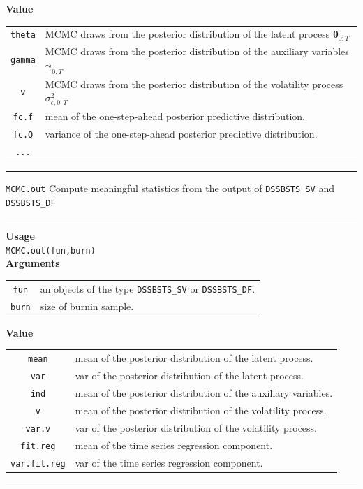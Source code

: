 \documentclass[
  12pt,
]{book}
\theoremstyle{break}
\theoremstyle{nonumberplain}
\begin{document}
\textbf{Value}

\begin{small}
\begin{longtable}{ c l }
\texttt{theta} & MCMC draws from the posterior distribution of the latent process $\boldsymbol{\theta}_{0:T}$  \\
\texttt{gamma} &  MCMC draws from the posterior distribution of the auxiliary variables $\boldsymbol{\gamma}_{0:T}$\\
\texttt{v} &  MCMC draws from the posterior distribution of the volatility process $\sigma^{2}_{\epsilon,0:T}$ \\
\texttt{fc.f} & mean of the one-step-ahead posterior predictive distribution.\\
\texttt{fc.Q} & variance of the one-step-ahead posterior predictive distribution.\\
\texttt{...} & 
\end{longtable}
\end{small}
\hrule
\vspace{1em}

\texttt{MCMC.out} Compute meaningful statistics from the output of
\texttt{DSSBSTS\_SV} and \texttt{DSSBSTS\_DF} \vspace{1em}

\hrule
\vspace{1em}

\textbf{Usage}\\
\texttt{MCMC.out(fun,burn)}\\
\textbf{Arguments}

\begin{small}
\begin{longtable}{ c l }
\texttt{fun} &  an objects of the type \texttt{DSSBSTS\_SV} or \texttt{DSSBSTS\_DF}. \\
\texttt{burn} &  size of burnin sample.
\end{longtable}
\end{small}

\textbf{Value}

\begin{small}
\begin{longtable}{ c l }
\texttt{mean} & mean of the posterior distribution of the latent process.  \\
\texttt{var} &  var of the posterior distribution of the latent process.\\
\texttt{ind} &  mean of the posterior distribution of the auxiliary variables.\\
\texttt{v} & mean of the posterior distribution of the volatility process.\\
\texttt{var.v} & var of the posterior distribution of the volatility process.\\
\texttt{fit.reg} & mean of the time series regression component.\\
\texttt{var.fit.reg} & var of the time series regression component.
\end{longtable}
\end{small}
\hrule
\vspace{0.5em}
\end{document}
